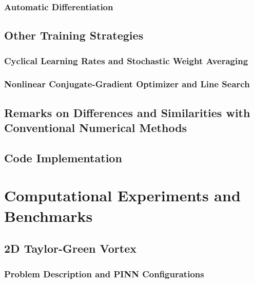 \documentclass[font=STIX2]{gw-dissertation}[2021/11/19]
\begin{document}
        \subsection{Automatic Differentiation}\label{sec:ad}
        

    \section{Other Training Strategies}
    

        \subsection{Cyclical Learning Rates and Stochastic Weight Averaging}\label{sec:cyclic-swa}
        

        \subsection{Nonlinear Conjugate-Gradient Optimizer and Line Search}\label{sec:ncg}
        

    \section{Remarks on Differences and Similarities with Conventional Numerical Methods}\label{sec:pinn-diff}
    

    \section{Code Implementation}\label{sec:pinn-code-impl}
    

\chapter{Computational Experiments and Benchmarks}\label{chap:pinn-cases}

    \section{2D Taylor-Green Vortex}\label{sec:pinn-2d-tgv}

        \subsection{Problem Description and PINN Configurations}
        \label{sec:pinn-2d-tgv-intro}
        
\end{document}
